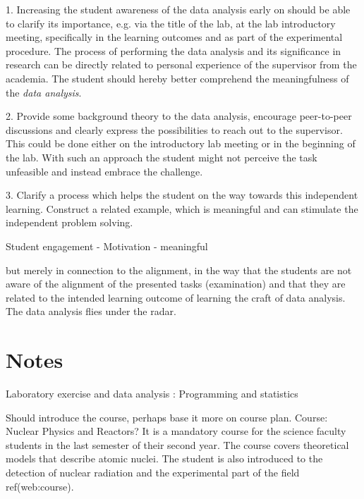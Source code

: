 \documentclass[]{article}
\begin{document}
1. Increasing the student awareness of the data analysis early on should be able to clarify its importance, e.g. via the title of the lab, at the lab introductory meeting, specifically in the learning outcomes and as part of the experimental procedure.
The process of performing the data analysis and its significance in research can be directly related to personal experience of the supervisor from the academia.
The student should hereby better comprehend the meaningfulness of the {\it data analysis}.

2. Provide some background theory to the data analysis, encourage peer-to-peer discussions and clearly express the possibilities to reach out to the supervisor.
This could be done either on the introductory lab meeting or in the beginning of the lab.
With such an approach the student might not perceive the task unfeasible and instead embrace the challenge.

3. Clarify a process which helps the student on the way towards this independent learning.
Construct a related example, which is meaningful and can stimulate the independent problem solving.


Student engagement - Motivation - meaningful




but merely in connection to the alignment, in the way that the students are not aware of the alignment of the presented tasks (examination) and that they are related to the intended learning outcome of learning the craft of data analysis.
The data analysis flies under the radar.







\section{Notes}
Laboratory exercise and data analysis : Programming and statistics

Should introduce the course, perhaps base it more on course plan.
Course: Nuclear Physics and Reactors?
It is a mandatory course for the science faculty students in the last semester of their second year.
The course covers theoretical models that describe atomic nuclei.
The student is also introduced to the detection of nuclear radiation and the experimental part of the field ref(web:course).
\end{document}
